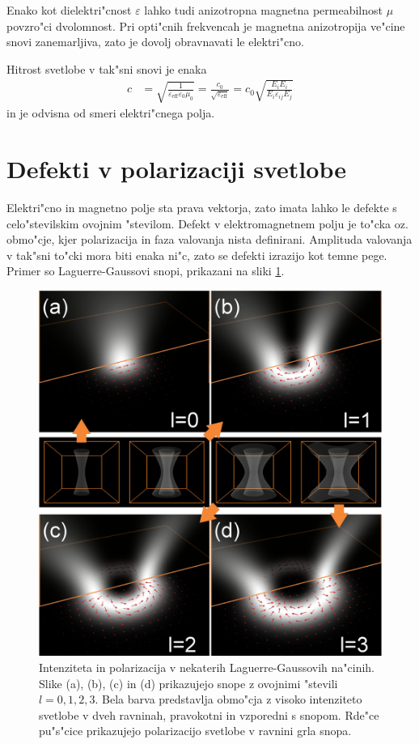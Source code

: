 \documentclass[12pt,twoside,openright,final]{report}
\begin{document}
Enako kot dielektri"cnost $\varepsilon$ lahko tudi anizotropna magnetna permeabilnost $\mu$ povzro"ci dvolomnost. 
Pri opti"cnih frekvencah je magnetna anizotropija ve"cine snovi zanemarljiva, zato je dovolj obravnavati le elektri"cno. 

Hitrost svetlobe v tak"sni snovi je enaka
\begin{align}
  c &= \sqrt{\frac{1}{\varepsilon_{\mathrm{eff}} \varepsilon_0 \mu_0}} = \frac{c_0}{\sqrt{\varepsilon_{\mathrm{eff}}}} = c_0\sqrt{\frac{E_iE_i}{E_i \varepsilon_{ij} E_j}}
\end{align}
in je odvisna od smeri elektri"cnega polja. 

\section{Defekti v polarizaciji svetlobe}
Elektri"cno in magnetno polje sta prava vektorja, zato imata lahko le defekte s celo"stevilskim ovojnim "stevilom. 
Defekt v elektromagnetnem polju je to"cka oz. obmo"cje, kjer polarizacija in faza valovanja nista definirani. 
Amplituda valovanja v tak"sni to"cki mora biti enaka ni"c, zato se defekti izrazijo kot temne pege. 
Primer so Laguerre-Gaussovi snopi, prikazani na sliki \ref{fig:laguerre-gauss}. 

\begin{figure}[!ht]
 \centering
 \includegraphics[width=.8\textwidth]{1_v6}
 \caption{Intenziteta in polarizacija v nekaterih Laguerre-Gaussovih na"cinih. Slike (a), (b), (c) in (d) prikazujejo snope z ovojnimi "stevili $l = 0,1,2,3$. Bela barva predstavlja obmo"cja z visoko intenziteto svetlobe v dveh ravninah, pravokotni in vzporedni s snopom. Rde"ce pu"s"cice prikazujejo polarizacijo svetlobe v ravnini grla snopa. \cite{porenta}}
 \label{fig:laguerre-gauss}
\end{figure}
\end{document}
